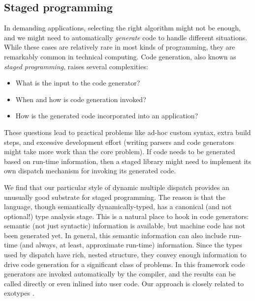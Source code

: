 \subsection{Staged programming}

In demanding applications, selecting the right algorithm might not
be enough, and we might need to automatically \emph{generate} code
to handle different situations. While these cases are relatively rare
in most kinds of programming, they are remarkably common in technical
computing. Code generation, also known as \emph{staged programming},
raises several complexities:

\vspace{-3ex}
\begin{singlespace}
\begin{itemize}
\item What is the input to the code generator?
\item When and how is code generation invoked?
\item How is the generated code incorporated into an application?
\end{itemize}
\end{singlespace}

\noindent
These questions lead to practical problems like ad-hoc custom syntax,
extra build steps, and excessive development effort (writing parsers and
code generators might take more work than the core problem).
If code needs to be generated based on run-time information, then a
staged library might need to implement its own dispatch mechanism
for invoking its generated code.

We find that our particular style of dynamic multiple dispatch provides
an unusually good substrate for staged programming.
The reason is that the language, though semantically dynamically-typed,
has a canonical (and not optional!) type analysis stage.
This is a natural place to hook in code generators: semantic (not just
syntactic) information is available, but machine code has not been
generated yet.
In general, this semantic information can also include run-time (and
always, at least, approximate run-time) information.
Since the types used by dispatch have rich, nested structure, they
convey enough information to drive code generation for a significant
class of problems.
In this framework code generators are invoked automatically by
the compiler, and the results can be called directly or even inlined
into user code.
Our approach is closely related to exotypes
\cite{DeVito:2014:FRG:2594291.2594307}.



